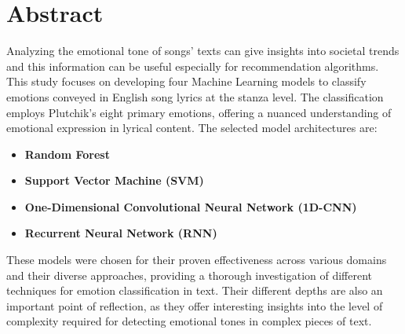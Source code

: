 \firstchapter
\chapter*{Abstract}
\label{ch:abstract}



Analyzing the emotional tone of songs' texts can give insights into societal trends and this information can be useful especially for recommendation
algorithms. This study focuses on developing four Machine Learning models to classify
emotions conveyed in English song lyrics at the stanza level. The
classification employs Plutchik's eight primary emotions,
offering a nuanced understanding of emotional expression in lyrical content.
The selected model architectures are:
\begin{itemize}
    \item \textbf{Random Forest}
    \item \textbf{Support Vector Machine (SVM)}
    \item \textbf{One-Dimensional Convolutional Neural Network (1D-CNN)}
    \item \textbf{Recurrent Neural Network (RNN)}
\end{itemize}
These models were chosen for their proven effectiveness across various
domains and their diverse approaches, providing a thorough
investigation of different techniques for emotion classification in text.
Their different depths are also an important point of reflection, as they
offer interesting insights into the level of complexity required for detecting
emotional tones in complex pieces of text.